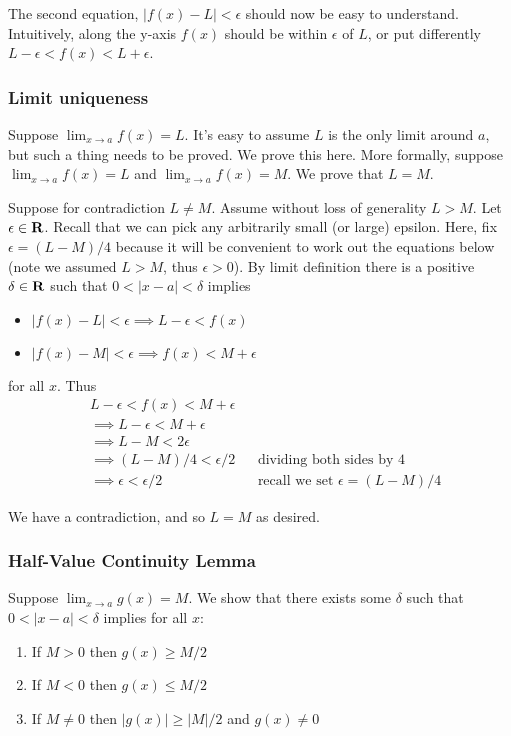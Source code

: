 \vs

The second equation, $|f(x)-L|<\epsilon$ should now be easy to understand. Intuitively, along the y-axis $f(x)$ should be within $\epsilon$ of $L$, or put differently $L-\epsilon<f(x)<L+\epsilon$.

\subsubsection{Limit uniqueness}
Suppose $\lim_{x\to a}f(x)=L$. It's easy to assume $L$ is the only limit around $a$, but such a thing needs to be proved. We prove this here. More formally, suppose $\lim_{x\to a}f(x)=L$ and $\lim_{x\to a}f(x)=M$. We prove that $L=M$.

\vs

Suppose for contradiction $L\neq M$. Assume without loss of generality $L>M$. Let $\epsilon\in\mathbf{R}$. Recall that we can pick any arbitrarily small (or large) epsilon. Here, fix $\epsilon=(L-M)/4$ because it will be convenient to work out the equations below (note we assumed $L>M$, thus $\epsilon>0$). By limit definition there is a positive $\delta\in\mathbf{R}$ such that $0<|x-a|<\delta$ implies
\begin{itemize}
    \item $|f(x)-L|<\epsilon\implies L-\epsilon<f(x)$
    \item $|f(x)-M|<\epsilon\implies f(x)<M+\epsilon$
\end{itemize}
for all $x$. Thus
\begin{align*}
    &L-\epsilon<f(x)<M+\epsilon\\
    &\implies L-\epsilon<M+\epsilon\\
    &\implies L-M<2\epsilon\\
    &\implies (L-M)/4<\epsilon/2&&\text{dividing both sides by 4}\\
    &\implies \epsilon<\epsilon/2&&\text{recall we set $\epsilon=(L-M)/4$}
\end{align*}

We have a contradiction, and so $L=M$ as desired.

\subsubsection{Half-Value Continuity Lemma}
Suppose $\lim_{x\to a}g(x)=M$. We show that there exists some $\delta$ such that $0<|x-a|<\delta$ implies for all $x$:
\begin{enumerate}
    \item If $M>0$ then $g(x)\geq M/2$
    \item If $M<0$ then $g(x)\leq M/2$
    \item If $M\neq 0$ then $|g(x)|\geq|M|/2$ and $g(x)\neq 0$
\end{enumerate}

